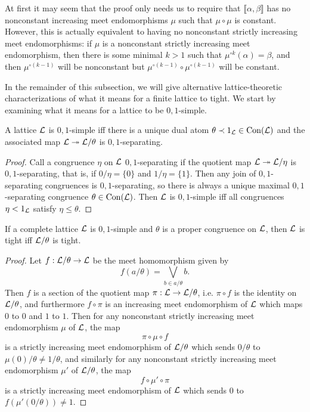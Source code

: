 \begin{appendices}
At first it may seem that the proof only needs us to require that $\llbracket \alpha, \beta \rrbracket$ has no nonconstant increasing meet endomorphisms $\mu$ such that $\mu \circ \mu$ is constant. However, this is actually equivalent to having no nonconstant strictly increasing meet endomorphisms: if $\mu$ is a nonconstant strictly increasing meet endomorphism, then there is some minimal $k > 1$ such that $\mu^{\circ k}(\alpha) = \beta$, and then $\mu^{\circ (k-1)}$ will be nonconstant but $\mu^{\circ (k-1)} \circ \mu^{\circ (k-1)}$ will be constant.

In the remainder of this subsection, we will give alternative lattice-theoretic characterizations of what it means for a finite lattice to tight. We start by examining what it means for a lattice to be $0,1$-simple.

\begin{prop} A lattice $\mathcal{L}$ is $0,1$-simple iff there is a unique dual atom $\theta \prec 1_{\mathcal{L}} \in \operatorname{Con}(\mathcal{L})$ and the associated map $\mathcal{L} \twoheadrightarrow \mathcal{L}/\theta$ is $0,1$-separating.
\end{prop}
\begin{proof} Call a congruence $\eta$ on $\mathcal{L}$ $0,1$-separating if the quotient map $\mathcal{L} \twoheadrightarrow \mathcal{L}/\eta$ is $0,1$-separating, that is, if $0/\eta = \{0\}$ and $1/\eta = \{1\}$. Then any join of $0,1$-separating congruences is $0,1$-separating, so there is always a unique maximal $0,1$-separating congruence $\theta \in \operatorname{Con}(\mathcal{L})$. Then $\mathcal{L}$ is $0,1$-simple iff all congruences $\eta < 1_{\mathcal{L}}$ satisfy $\eta \le \theta$.
\end{proof}

\begin{prop} If a complete lattice $\mathcal{L}$ is $0,1$-simple and $\theta$ is a proper congruence on $\mathcal{L}$, then $\mathcal{L}$ is tight iff $\mathcal{L}/\theta$ is tight.
\end{prop}
\begin{proof} Let $f : \mathcal{L}/\theta \rightarrow \mathcal{L}$ be the meet homomorphism given by
\[
f(a/\theta) = \bigvee_{b \in a/\theta} b.
\]
Then $f$ is a section of the quotient map $\pi : \mathcal{L} \rightarrow \mathcal{L}/\theta$, i.e. $\pi \circ f$ is the identity on $\mathcal{L}/\theta$, and furthermore $f \circ \pi$ is an increasing meet endomorphism of $\mathcal{L}$ which maps $0$ to $0$ and $1$ to $1$. Then for any nonconstant strictly increasing meet endomorphism $\mu$ of $\mathcal{L}$, the map
\[
\pi \circ \mu \circ f
\]
is a strictly increasing meet endomorphism of $\mathcal{L}/\theta$ which sends $0/\theta$ to $\mu(0)/\theta \ne 1/\theta$, and similarly for any nonconstant strictly increasing meet endomorphism $\mu'$ of $\mathcal{L}/\theta$, the map
\[
f \circ \mu' \circ \pi
\]
is a strictly increasing meet endomorphism of $\mathcal{L}$ which sends $0$ to $f(\mu'(0/\theta)) \ne 1$.
\end{proof}


\end{appendices}
